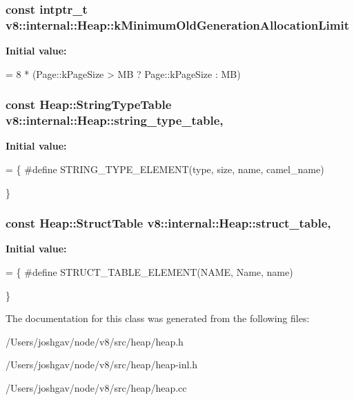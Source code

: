 \subsubsection[{\texorpdfstring{k\+Minimum\+Old\+Generation\+Allocation\+Limit}{kMinimumOldGenerationAllocationLimit}}]{\setlength{\rightskip}{0pt plus 5cm}const intptr\+\_\+t v8\+::internal\+::\+Heap\+::k\+Minimum\+Old\+Generation\+Allocation\+Limit\hspace{0.3cm}{\ttfamily [static]}}\hypertarget{classv8_1_1internal_1_1_heap_a7633d1868a73efa13b16e70e5284652d}{}\label{classv8_1_1internal_1_1_heap_a7633d1868a73efa13b16e70e5284652d}
{\bfseries Initial value\+:}
\begin{DoxyCode}
=
      8 * (Page::kPageSize > MB ? Page::kPageSize : MB)
\end{DoxyCode}
\subsubsection[{\texorpdfstring{string\+\_\+type\+\_\+table}{string_type_table}}]{\setlength{\rightskip}{0pt plus 5cm}const {\bf Heap\+::\+String\+Type\+Table} v8\+::internal\+::\+Heap\+::string\+\_\+type\+\_\+table\hspace{0.3cm}{\ttfamily [static]}, {\ttfamily [private]}}\hypertarget{classv8_1_1internal_1_1_heap_a7a0d1ada04f1378a2a69628e6c2761d1}{}\label{classv8_1_1internal_1_1_heap_a7a0d1ada04f1378a2a69628e6c2761d1}
{\bfseries Initial value\+:}
\begin{DoxyCode}
= \{
\textcolor{preprocessor}{#define STRING\_TYPE\_ELEMENT(type, size, name, camel\_name) }




\}
\end{DoxyCode}
\subsubsection[{\texorpdfstring{struct\+\_\+table}{struct_table}}]{\setlength{\rightskip}{0pt plus 5cm}const {\bf Heap\+::\+Struct\+Table} v8\+::internal\+::\+Heap\+::struct\+\_\+table\hspace{0.3cm}{\ttfamily [static]}, {\ttfamily [private]}}\hypertarget{classv8_1_1internal_1_1_heap_a809f1e6bcd5fe1bab932b436053468f0}{}\label{classv8_1_1internal_1_1_heap_a809f1e6bcd5fe1bab932b436053468f0}
{\bfseries Initial value\+:}
\begin{DoxyCode}
= \{
\textcolor{preprocessor}{#define STRUCT\_TABLE\_ELEMENT(NAME, Name, name)        }




\}
\end{DoxyCode}


The documentation for this class was generated from the following files\+:\begin{DoxyCompactItemize}
\item 
/\+Users/joshgav/node/v8/src/heap/heap.\+h\item 
/\+Users/joshgav/node/v8/src/heap/heap-\/inl.\+h\item 
/\+Users/joshgav/node/v8/src/heap/heap.\+cc\end{DoxyCompactItemize}
